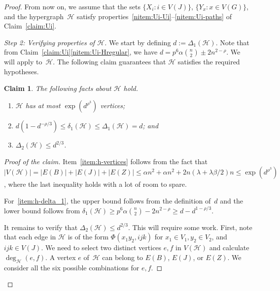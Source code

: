 \documentclass[a4paper, 11pt,reqno]{amsart}
\newcommand{\calH}{\mathcal{H}}
\theoremstyle{plain}
\newtheorem{claim}[theorem]{Claim}
\theoremstyle{definition}
\numberwithin{equation}{section}
\newenvironment{proofclaim}[1][Proof of the claim]{\begin{proof}[#1]\renewcommand*{\qedsymbol}{\(\square\)}}{\end{proof}}
\renewcommand*{\qedsymbol}{\(\blacksquare\)}
\begin{document}
\begin{proof}
From now on, we assume that the sets $\{ X_i : i \in V(J)\}$, $\{ Y_x : x \in V(G)\}$,
and the hypergraph~$\calH$ satisfy properties~\ref{nitem:Ui-Ui}--\ref{nitem:Ui-paths} 
of Claim~\ref{claim:Ui}.

\medskip

\noindent \emph{Step 2: Verifying properties of $\mathcal{H}$.}
We start by defining
\(
d := \Delta_1(\mathcal{H}).
\)
Note that from Claim~\ref{claim:Ui}\ref{nitem:Ui-Hregular}, we have
\(
d = p^6 \alpha \binom{n}{2} \pm 2n^{2 - \rho}.
\)
We will apply  to~$\mathcal{H}$.
The following claim guarantees that $\calH$ satisfies the required hypotheses.

\begin{claim} \label{claim:hypothesesH}
	The following facts about $\calH$ hold.
	\begin{enumerate}[\upshape{\textbf{(H\arabic*)}},labelindent=0pt,labelwidth=\widthof{\ref{Hlast}},leftmargin=!]
		\item \label{item:h-vertices} $\mathcal{H}$ has at most $\exp(d^{\rho^3})$ vertices;
		\item \label{item:h-delta_1} $d(1 - d^{-\rho/3}) \leq \delta_1(\mathcal{H}) \leq \Delta_1(\mathcal{H}) = d$; and
		\item $\Delta_2(\mathcal{H}) \leq d^{2/3}$.\label{Hlast}
	\end{enumerate}
\end{claim}

\begin{proofclaim}
	Item~\ref{item:h-vertices} follows from the fact that $|V(\calH)|
	= |E(B)|+|E(J)|+|E(Z)| \leq \alpha n^2 + \alpha n^2 +
	2n(\lambda+\lambda\beta/2)n \leq \exp(d^{\rho^3})$, where the last
	inequality holds with a lot of room to spare.
	
	For~\ref{item:h-delta_1}, the upper bound follows from the
	definition of~$d$ and the lower bound follows from $\delta_1(\calH)
	\geq p^6 \alpha \binom{n}{2} - 2n^{2 - \rho} \geq d - d^{1 - \rho/3}$.
	
	It remains to verify that $\Delta_2(\mathcal{H}) \leq
	d^{2/3}$. This will require some work. First, note that each edge
	in $\mathcal{H}$ is of the form $\Phi(x_1 y_2, ijk)$ for $x_1 \in
	V_1, y_2 \in V_2$, and $ijk \in V(J)$.  We need to select two
	distinct vertices $e, f$ in $V(\mathcal{H})$ and calculate $\deg_\calH(e,f)$.  A vertex $e$ of~$\mathcal{H}$ can belong to $E(B)$,
	$E(J)$, or $E(Z)$.  We consider all the six possible combinations
	for $e, f$.
	

\end{proofclaim}
\end{proof}
\end{document}
